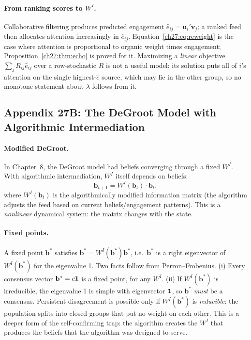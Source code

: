 \documentclass[../structural_economics_book.tex]{subfiles}
\begin{document}
\paragraph{From ranking scores to $W^I$.} Collaborative filtering produces predicted engagement $\hat e_{ij} = \mathbf{u}_i'\mathbf{v}_j$; a ranked feed then allocates attention increasingly in $\hat e_{ij}$. Equation~\eqref{ch27:eq:reweight} is the case where attention is proportional to organic weight times engagement; Proposition~\ref{ch27:thm:echo} is proved for it. Maximizing a \emph{linear} objective $\sum_j R_{ij}\hat e_{ij}$ over a row-stochastic $R$ is not a useful model: its solution puts all of $i$'s attention on the single highest-$\hat e$ source, which may lie in the other group, so no monotone statement about $\lambda$ follows from it.


\subsection*{Appendix 27B: The DeGroot Model with Algorithmic Intermediation}
\label{ch27:app:degroot_algo}

\paragraph{Modified DeGroot.} In Chapter~8, the DeGroot model had beliefs converging through a fixed $W^I$. With algorithmic intermediation, $W^I$ itself depends on beliefs:
\begin{equation}
\mathbf{b}_{t+1} = W^I(\mathbf{b}_t) \cdot \mathbf{b}_t,
\end{equation}
where $W^I(\mathbf{b}_t)$ is the algorithmically modified information matrix (the algorithm adjusts the feed based on current beliefs/engagement patterns). This is a \textit{nonlinear} dynamical system: the matrix changes with the state.

\paragraph{Fixed points.} A fixed point $\mathbf{b}^*$ satisfies $\mathbf{b}^* = W^I(\mathbf{b}^*)\mathbf{b}^*$, i.e.\ $\mathbf{b}^*$ is a right eigenvector of $W^I(\mathbf{b}^*)$ for the eigenvalue 1. Two facts follow from Perron--Frobenius. (i) Every consensus vector $\mathbf{b}^* = c\mathbf{1}$ is a fixed point, for any $W^I$. (ii) If $W^I(\mathbf{b}^*)$ is irreducible, the eigenvalue 1 is simple with eigenvector $\mathbf{1}$, so $\mathbf{b}^*$ \emph{must} be a consensus. Persistent disagreement is possible only if $W^I(\mathbf{b}^*)$ is \emph{reducible}: the population splits into closed groups that put no weight on each other. This is a deeper form of the self-confirming trap: the algorithm creates the $W^I$ that produces the beliefs that the algorithm was designed to serve.
\end{document}
